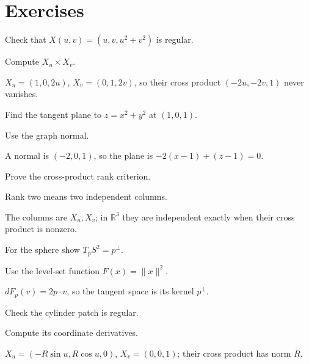 \section{Exercises}
\begin{exercise}\label{exr:vii14-01}
Check that \(X(u,v)=(u,v,u^2+v^2)\) is regular.
\end{exercise}
\begin{hint}
Compute \(X_u\times X_v\).
\end{hint}
\begin{solution}
\(X_u=(1,0,2u)\), \(X_v=(0,1,2v)\), so their cross product \((-2u,-2v,1)\) never vanishes.
\end{solution}

\begin{exercise}\label{exr:vii14-02}
Find the tangent plane to \(z=x^2+y^2\) at \((1,0,1)\).
\end{exercise}
\begin{hint}
Use the graph normal.
\end{hint}
\begin{solution}
A normal is \((-2,0,1)\), so the plane is \(-2(x-1)+(z-1)=0\).
\end{solution}

\begin{exercise}\label{exr:vii14-03}
Prove the cross-product rank criterion.
\end{exercise}
\begin{hint}
Rank two means two independent columns.
\end{hint}
\begin{solution}
The columns are \(X_u,X_v\); in \(\mathbb R^3\) they are independent exactly when their cross product is nonzero.
\end{solution}

\begin{exercise}\label{exr:vii14-04}
For the sphere show \(T_pS^2=p^\perp\).
\end{exercise}
\begin{hint}
Use the level-set function \(F(x)=\|x\|^2\).
\end{hint}
\begin{solution}
\(dF_p(v)=2p\cdot v\), so the tangent space is its kernel \(p^\perp\).
\end{solution}

\begin{exercise}\label{exr:vii14-05}
Check the cylinder patch is regular.
\end{exercise}
\begin{hint}
Compute its coordinate derivatives.
\end{hint}
\begin{solution}
\(X_u=(-R\sin u,R\cos u,0)\), \(X_v=(0,0,1)\); their cross product has norm \(R\).
\end{solution}

